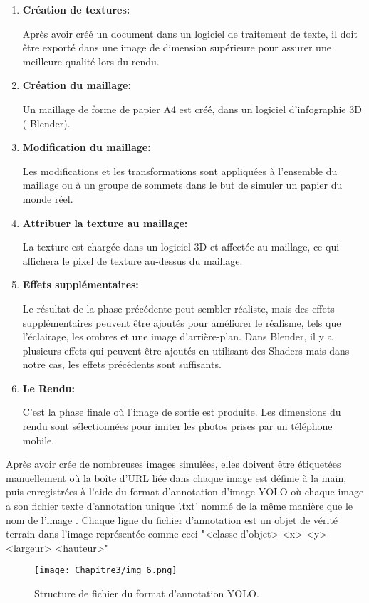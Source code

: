 \begin{enumerate}
 \item \textbf{Création de textures: } 
 
 Après avoir créé un document dans un logiciel de traitement de texte, il doit être exporté dans une image de dimension supérieure pour 	assurer une meilleure qualité lors du rendu.\\
 
 \item \textbf{Création du maillage: } 
 
Un maillage de forme de papier A4 est créé, dans un logiciel d'infographie 3D ( Blender). 
 
 \item \textbf{Modification du maillage: } 
 
 Les modifications et les transformations sont appliquées à l'ensemble du maillage ou à un groupe de sommets dans le but de simuler un papier du monde réel. 
 
 \item \textbf{Attribuer la texture au maillage: } 
 
 La texture est chargée dans un logiciel 3D et affectée au maillage, ce qui affichera le pixel de texture au-dessus du maillage.
 
 \item \textbf{Effets supplémentaires: } 
 
 Le résultat de la phase précédente peut sembler réaliste, mais des effets supplémentaires peuvent être ajoutés pour améliorer le réalisme, tels que l'éclairage, les ombres et une image d'arrière-plan. Dans Blender, il y a plusieurs effets qui peuvent être ajoutés en utilisant des Shaders mais dans notre cas, les effets précédents sont suffisants.
 
 \item \textbf{Le Rendu: } 
 
 C'est la phase finale où l'image de sortie est produite. Les dimensions du rendu sont sélectionnées pour imiter les photos prises par un téléphone mobile.
 
 \end{enumerate} 
 
Après avoir crée de nombreuses images simulées, elles doivent être étiquetées manuellement où la boîte d'URL liée dans chaque image est définie à la main, puis enregistrées à l'aide du format d'annotation d'image YOLO où chaque image a son fichier texte d'annotation unique '.txt' nommé de la même manière que le nom de l'image . Chaque ligne du fichier d'annotation est un objet de vérité terrain dans l'image représentée comme ceci "<classe d'objet> <x> <y> <largeur> <hauteur>"
          \begin{figure}[H]
               \centering
               \texttt{[image: Chapitre3/img\_6.png]}
               \caption{Structure de fichier du format d'annotation YOLO.}
               \label{img7}
               \end{figure}

